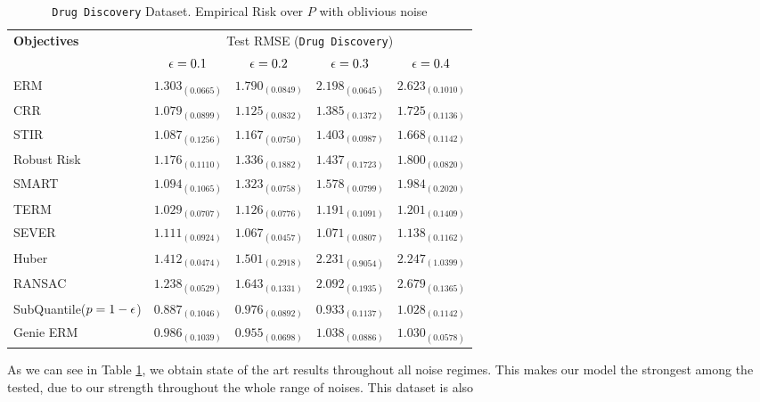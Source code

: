 \documentclass{article} %
\newcommand{\subhead}[1]{\multicolumn{1}{c}{#1}}%
\begin{document}
	\begin{table}[!h]
		\centering
		\begin{tabular}{lcccc}
			\toprule 
			\textbf{Objectives}&\multicolumn{4}{c}{Test RMSE (\texttt{Drug Discovery})}\\                   
			\cmidrule(rl){2-5}
			&\subhead{${\epsilon} = 0.1$}& \subhead{${\epsilon} = 0.2$}& \subhead{${\epsilon} = 0.3$}& \subhead{${\epsilon} = 0.4$}\\ 
			\midrule
			ERM  &$1.303_{(0.0665)}$&$1.790_{(0.0849)}$&$2.198_{(0.0645)}$&$2.623_{(0.1010)}$\\
			CRR \cite{bhatia2017}  &$1.079_{(0.0899)}$&$1.125_{(0.0832)}$&$1.385_{(0.1372)}$&$1.725_{(0.1136)}$\\
			STIR \cite{pmlr-v89-mukhoty19a} &$1.087_{(0.1256)}$&$1.167_{(0.0750)}$&$1.403_{(0.0987)}$&$1.668_{(0.1142)}$\\
			Robust Risk \cite{RRM} &$1.176_{(0.1110)}
			$&$1.336_{(0.1882)}$&$1.437_{(0.1723)}$&$1.800_{(0.0820)}$\\
			SMART \cite{https://doi.org/10.48550/arxiv.2206.04777} &$1.094_{(0.1065)}$&$1.323_{(0.0758)}$&$1.578_{(0.0799)}$&$1.984_{(0.2020)}$\\
			TERM \cite{li2020tilted} &$\mathbf{1.029_{(0.0707)}}$&$1.126_{(0.0776)}$&$1.191_{(0.1091)}$&$1.201_{(0.1409)}$\\
			SEVER \cite{DiakonikolasKKLSS19} &$1.111_{(0.0924)}$&$\mathbf{1.067_{(0.0457)}}$&$\mathbf{1.071_{(0.0807)}}$&$\mathbf{1.138_{(0.1162)}}$\\
			Huber \cite{Huber2009} &$1.412_{(0.0474)}$&$1.501_{(0.2918)}$&$2.231_{(0.9054)}$&$2.247_{(1.0399)}$\\
			RANSAC \cite{RANSAC1981} &$1.238_{(0.0529)}$&$1.643_{(0.1331)}$&$2.092_{(0.1935)}$&$2.679_{(0.1365)}$\\
			\rowcolor{LightCyan}
			SubQuantile($p = 1-{\epsilon}$) &$\mathbf{0.887_{(0.1046)}}$&$\mathbf{0.976_{(0.0892)}}$&$\mathbf{0.933_{(0.1137)}}$&$\mathbf{1.028_{(0.1142)}}$\\
			\midrule 
			Genie ERM &$0.986_{(0.1039)}$&$0.955_{(0.0698)}$&$1.038_{(0.0886)}$&$1.030_{(0.0578)}$\\
			\bottomrule
		\end{tabular}
		\caption{\texttt{Drug Discovery} Dataset. Empirical Risk over $P$ with oblivious noise}
		\label{tab:drug-discovery}
	\end{table}
	
	As we can see in Table \ref{tab:drug-discovery}, we obtain state of the art results throughout all noise regimes. This makes our model the strongest among the tested, due to our strength throughout the whole range of noises. This dataset is also 
	
\end{document}
